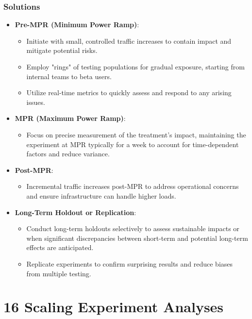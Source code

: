 \documentclass{article}
\begin{document}
\subsubsection*{Solutions}
\begin{itemize}
    \item \textbf{Pre-MPR (Minimum Power Ramp)}:
    \begin{itemize}
        \item Initiate with small, controlled traffic increases to contain impact and mitigate potential risks.
        \item Employ "rings" of testing populations for gradual exposure, starting from internal teams to beta users.
        \item Utilize real-time metrics to quickly assess and respond to any arising issues.
    \end{itemize}

    \item \textbf{MPR (Maximum Power Ramp)}:
    \begin{itemize}
        \item Focus on precise measurement of the treatment's impact, maintaining the experiment at MPR typically for a week to account for time-dependent factors and reduce variance.
    \end{itemize}

    \item \textbf{Post-MPR}:
    \begin{itemize}
        \item Incremental traffic increases post-MPR to address operational concerns and ensure infrastructure can handle higher loads.
    \end{itemize}

    \item \textbf{Long-Term Holdout or Replication}:
    \begin{itemize}
        \item Conduct long-term holdouts selectively to assess sustainable impacts or when significant discrepancies between short-term and potential long-term effects are anticipated.
        \item Replicate experiments to confirm surprising results and reduce biases from multiple testing.
    \end{itemize}
\end{itemize}

\section*{16 Scaling Experiment Analyses}
\end{document}
